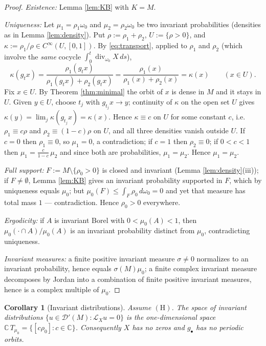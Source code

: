 \documentclass[11pt]{amsart}
\theoremstyle{plain}
\newtheorem{corollary}[theorem]{Corollary}
\theoremstyle{definition}
\theoremstyle{remark}
\newcommand{\Dp}{\mathcal{D}'}
\newcommand{\C}{\mathbb{C}}
\newcommand{\Lx}{\mathcal{L}_X}
\begin{document}
\begin{proof}
\emph{Existence:} Lemma \ref{lem:KB} with $K=M$.

\emph{Uniqueness:} Let $\mu_1=\rho_1\omega_0$ and $\mu_2=\rho_2\omega_0$
be two invariant probabilities (densities as in Lemma \ref{lem:density}).
Put $\rho:=\rho_1+\rho_2$, $U:=\{\rho>0\}$, and
$\kappa:=\rho_1/\rho\in C^\infty(U,[0,1])$. By \eqref{eq:transport},
applied to $\rho_1$ and $\rho_2$ (which involve the \emph{same}
cocycle $\int_0^t\operatorname{div}_{\omega_0}X\,ds$),
\[
\kappa(g_tx)=\frac{\rho_1(g_tx)}{\rho_1(g_tx)+\rho_2(g_tx)}
=\frac{\rho_1(x)}{\rho_1(x)+\rho_2(x)}=\kappa(x)
\qquad (x\in U).
\]
Fix $x\in U$. By Theorem \ref{thm:minimal} the orbit of $x$ is dense in
$M$ and it stays in $U$. Given $y\in U$, choose $t_j$ with
$g_{t_j}x\to y$; continuity of $\kappa$ on the open set $U$ gives
$\kappa(y)=\lim_j\kappa(g_{t_j}x)=\kappa(x)$. Hence $\kappa\equiv c$ on
$U$ for some constant $c$, i.e.\ $\rho_1\equiv c\rho$ and
$\rho_2\equiv(1-c)\rho$ on $U$, and all three densities vanish outside
$U$. If $c=0$ then $\rho_1\equiv0$, so $\mu_1=0$, a contradiction; if
$c=1$ then $\rho_2\equiv0$; if $0<c<1$ then
$\mu_1=\frac{c}{1-c}\,\mu_2$ and since both are probabilities,
$\mu_1=\mu_2$. Hence $\mu_1=\mu_2$.

\emph{Full support:} $F:=M\setminus\{\rho_0>0\}$ is closed and
invariant (Lemma \ref{lem:density}(iii)); if $F\neq\emptyset$, Lemma
\ref{lem:KB} gives an invariant probability supported in $F$, which by
uniqueness equals $\mu_0$; but
$\mu_0(F)\le\int_F\rho_0\,d\omega_0=0$ and yet that measure has total
mass $1$ --- contradiction. Hence $\rho_0>0$ everywhere.

\emph{Ergodicity:} if $A$ is invariant Borel with
$0<\mu_0(A)<1$, then $\mu_0(\cdot\cap A)/\mu_0(A)$ is an invariant
probability distinct from $\mu_0$, contradicting uniqueness.

\emph{Invariant measures:} a finite positive invariant measure
$\sigma\neq0$ normalizes to an invariant probability, hence equals
$\sigma(M)\mu_0$; a finite complex invariant measure decomposes by Jordan
into a combination of finite positive invariant measures, hence is a
complex multiple of $\mu_0$.
\end{proof}

\begin{corollary}[Invariant distributions]\label{cor:invdim}
Assume $(\mathrm{H})$. The space of invariant distributions
$\{u\in\Dp(M): \Lx u=0\}$ is the one-dimensional space
$\C\,T_{\mu_0}=\{[c\rho_0]:c\in\C\}$. Consequently $X$ has no zeros and
$g_\bullet$ has no periodic orbits.
\end{corollary}
\end{document}
